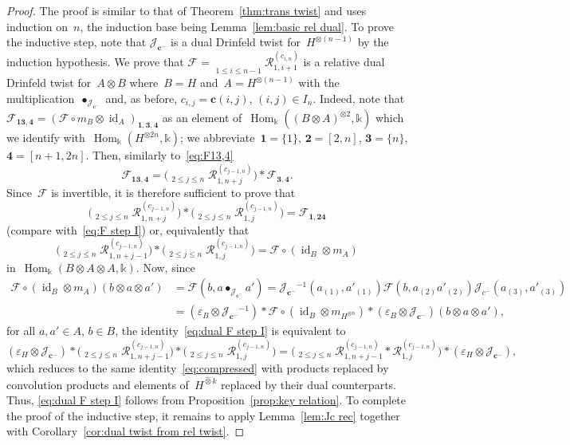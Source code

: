 \documentclass[12pt, reqno]{amsart}
\newcommand{\wh}[1]{\widehat{#1}}
\theoremstyle{definition}
\newcommand{\dscprodst}{\mathop{\overleftarrow{\prod}^\ast}}
\numberwithin{equation}{section}
\newcommand{\tensor}{\otimes}
\newcommand{\kk}{\mathbb{k}}\newcommand{\lie}[1]{{\mathfrak{#1}}}
\DeclareMathOperator{\id}{id}
\DeclareMathOperator{\Hom}{Hom}
\begin{document}
\begin{proof}
The proof is similar to that of Theorem~\ref{thm:trans twist} and uses induction on~$n$, the induction base being Lemma~\ref{lem:basic rel dual}. To prove the 
inductive step, note that $\mathcal J_{\mathbf c^-}$
is a dual Drinfeld twist for~$H^{\tensor (n-1)}$
by the induction hypothesis.
We prove that  
$\mathcal F=\dscprodst \limits_{1\le i\le n-1}
\mathcal R_{1,i+1}^{(c_{i,n})}$
is a relative dual Drinfeld twist for~$A\tensor B$ where~$B=H$ and~$A=H^{\tensor(n-1)}$
with the multiplication~$\bullet_{\mathcal J_{\mathbf c^-}}$ and, as before, $c_{i,j}=\mathbf c(i,j)$, $(i,j)\in I_n$.
Indeed, note that $\mathcal F_{\mathbf{13},\mathbf 4}
=(\mathcal F\circ m_B\tensor\id_A)_{\mathbf 1,\mathbf 3,\mathbf 4}$ as an element of~$\Hom_\kk((B\tensor A)^{\tensor 2},\kk)$ which we identify with~$
\Hom_\kk(H^{\tensor 2n},\kk)$; we abbreviate~$\mathbf 1=\{1\}$,
$\mathbf 2=[2,n]$, $\mathbf 3=\{n\}$, $\mathbf 4=[n+1,2n]$. Then, similarly to~\eqref{eq:F13,4}
$$
\mathcal F_{\mathbf{13},\mathbf 4}=\Big(\dscprodst_{2\le j\le n}
\mathcal R_{1,n+j}^{(c_{j-1,n})}\Big)\ast \mathcal F_{\mathbf 3,\mathbf 4}.
$$
Since~$\mathcal F$ is invertible, it is therefore sufficient to prove that
$$
\Big(\dscprodst_{2\le j\le n}
\mathcal R_{1,n+j}^{(c_{j-1,n})}\Big)\ast 
\Big(\dscprodst_{2\le j\le n}
\mathcal R_{1,j}^{(c_{j-1,n})}\Big)
=\mathcal F_{\mathbf 1,\mathbf{24}}
$$
(compare with~\eqref{eq:F step I}) or, equivalently that
\begin{equation}\label{eq:dual F step I}
\Big(\dscprodst_{2\le j\le n}
\mathcal R_{1,n+j-1}^{(c_{j-1,n})}\Big)\ast 
\Big(\dscprodst_{2\le j\le n}
\mathcal R_{1,j}^{(c_{j-1,n})}\Big)
=\mathcal F\circ(\id_B\tensor m_A)
\end{equation}
in~$\Hom_\kk(B\tensor A\tensor A,\kk)$.
Now, since 
\begin{align*}\mathcal F\circ(\id_B\tensor m_A)(b\tensor a\tensor a')&=\mathcal F(b,a\bullet_{\mathcal J_{\mathbf c^-}} a')
=\mathcal J_{\mathbf c^-}{}^{-1}(a_{(1)},a'_{(1)})\mathcal F(b,a_{(2)}a'_{(2)})
\mathcal J_{c^-}(a_{(3)},a'_{(3)})\\
&=(\varepsilon_B\tensor \mathcal J_{\mathbf c^-}{}^{-1})\ast 
\mathcal F\circ(\id_B\tensor m_{H^{\tensor n}})\ast 
(\varepsilon_B\tensor \mathcal J_{\mathbf c^-})(b\tensor a\tensor a'),
\end{align*}
for all $a,a'\in A$, $b\in B$,
the identity~\eqref{eq:dual F step I} is equivalent to
$$
(\varepsilon_H\tensor \mathcal J_{\mathbf c^-})\ast 
\Big(\dscprodst_{2\le j\le n}
\mathcal R_{1,n+j-1}^{(c_{j-1,n})}\Big)\ast 
\Big(\dscprodst_{2\le j\le n}
\mathcal R_{1,j}^{(c_{j-1,n})}\Big)=
\Big(\dscprodst_{2\le j\le n}
\mathcal R_{1,n+j-1}^{(c_{j-1,n})}\ast \mathcal R_{1,j}^{(c_{j-1,n})}\Big)\ast (\varepsilon_H\tensor \mathcal J_{\mathbf c^-}),
$$
which reduces to the same identity~\eqref{eq:compressed}
with products replaced by convolution products and elements of~$H^{\wh\tensor k}$ replaced by their dual counterparts. Thus, \eqref{eq:dual F step I} follows from Proposition~\ref{prop:key relation}.
To complete the proof of the inductive step,
it remains to apply Lemma~\ref{lem:Jc rec}
together with Corollary~\ref{cor:dual twist from rel twist}.
\end{proof}
\end{document}
